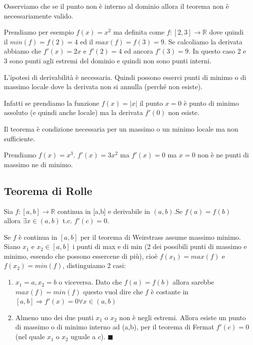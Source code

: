 \begin{observation}
Osserviamo che se il punto non è interno al dominio allora il teorema non è necessariamente valido.
\end{observation}
\begin{example}
Prendiamo per esempio $f(x) = x^2$ ma definita come $f: [2,3] \to \mathbb{R}$ dove quindi il $min(f) = f(2) = 4$ ed il $max(f) = f(3) = 9$. Se calcoliamo la derivata abbiamo che $f'(x) = 2x$ e $f'(2) = 4$ ed ancora $f'(3) = 9$.
In questo caso 2 e 3 sono punti agli estremi del dominio e quindi non sono punti interni.
\end{example}

\begin{observation}
L'ipotesi di derivabilità è necessaria. Quindi possono esserci punti di minimo o di massimo locale dove la derivata non si annulla (perché non esiste).
\end{observation}
\begin{example}
Infatti se prendiamo la funzione $f(x) = |x|$ il punto $x = 0$ è punto di minimo assoluto (e quindi anche locale) ma la derivata $f'(0)$ non esiste.
\end{example}

\begin{observation}
Il teorema è condizione necessaria per un massimo o un minimo locale ma non sufficiente.
\end{observation}
\begin{example}
Prendiamo $f(x) = x^3$. $f'(x) = 3x^2$ ma $f'(x) = 0$ ma $x=0$ non è ne punti di massimo ne di minimo.
\end{example}

\subsection{Teorema di Rolle}
\begin{theorem}
    Sia $f: [a,b] \to \mathbb{R}$ continua in [a,b] e derivabile in $(a,b)$.Se $f(a) = f(b)$ allora $\exists x \in (a,b)$ t.c. $f'(c) = 0$.
\end{theorem}

\begin{demostration}
Se $f$ è continua in $[a,b]$ per il teorema di Weirstrass assume massimo minimo. Siano $x_1$ e $x_2 \in [a,b]$ i punti di max e di min (2 dei possibili punti di massimo e minimo, essendo che possono essercene di più), cioè $f(x_1) = max(f)$ e $f(x_2) = min(f)$, distinguiamo 2 casi:
\begin{enumerate}
    \item $x_1 = a, x_2 = b$ o viceversa. Dato che $f(a) = f(b)$ allora sarebbe $max(f) = min(f)$ questo vuol dire che $f$ è costante in $[a,b] \Longrightarrow f'(x) = 0 \forall x \in (a,b)$
    \item Almeno uno dei due punti $x_1$ o $x_2$ non è negli estremi. Allora esiste un punto di massimo o di minimo interno ad (a,b), per il teorema di Fermat $f'(c) = 0$ (nel quale $x_1$ o $x_2$ uguale a $c$). $\blacksquare$
\end{enumerate}
\end{demostration}

